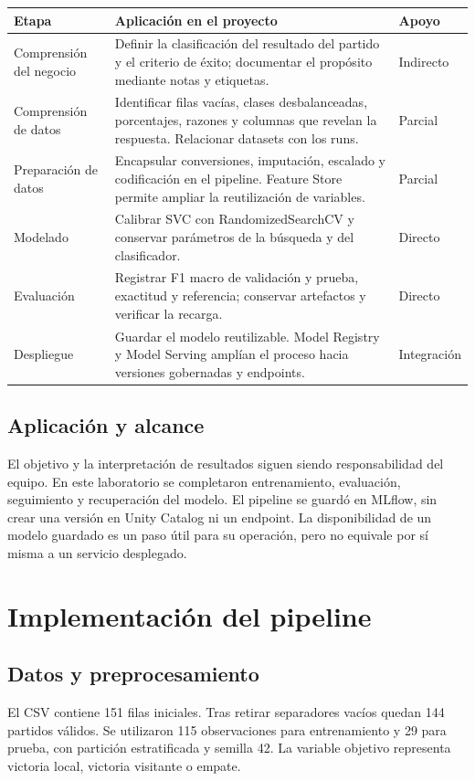\documentclass[12pt,a4paper]{article}
\begin{document}
\renewcommand{\arraystretch}{1.3}
\noindent\begin{tabular}{@{}>{\raggedright\arraybackslash}p{} >{\raggedright\arraybackslash}p{} >{\raggedright\arraybackslash}p{}@{}}
\toprule
\textbf{Etapa} & \textbf{Aplicación en el proyecto} & \textbf{Apoyo}\\
\midrule
Comprensión del negocio & Definir la clasificación del resultado del partido y el criterio de éxito; documentar el propósito mediante notas y etiquetas. & Indirecto\\
Comprensión de datos & Identificar filas vacías, clases desbalanceadas, porcentajes, razones y columnas que revelan la respuesta. Relacionar datasets con los runs. & Parcial\\
Preparación de datos & Encapsular conversiones, imputación, escalado y codificación en el pipeline. Feature Store permite ampliar la reutilización de variables. & Parcial\\
Modelado & Calibrar SVC con RandomizedSearchCV y conservar parámetros de la búsqueda y del clasificador. & Directo\\
Evaluación & Registrar F1 macro de validación y prueba, exactitud y referencia; conservar artefactos y verificar la recarga. & Directo\\
Despliegue & Guardar el modelo reutilizable. Model Registry y Model Serving amplían el proceso hacia versiones gobernadas y endpoints. & Integración\\
\bottomrule
\end{tabular}

\subsection{Aplicación y alcance}
El objetivo y la interpretación de resultados siguen siendo responsabilidad del equipo. En este laboratorio se completaron entrenamiento, evaluación, seguimiento y recuperación del modelo. El pipeline se guardó en MLflow, sin crear una versión en Unity Catalog ni un endpoint. La disponibilidad de un modelo guardado es un paso útil para su operación, pero no equivale por sí misma a un servicio desplegado.

\newpage
\section{Implementación del pipeline}
\subsection{Datos y preprocesamiento}
El CSV contiene 151 filas iniciales. Tras retirar separadores vacíos quedan 144 partidos válidos. Se utilizaron 115 observaciones para entrenamiento y 29 para prueba, con partición estratificada y semilla 42. La variable objetivo representa victoria local, victoria visitante o empate.
\end{document}
